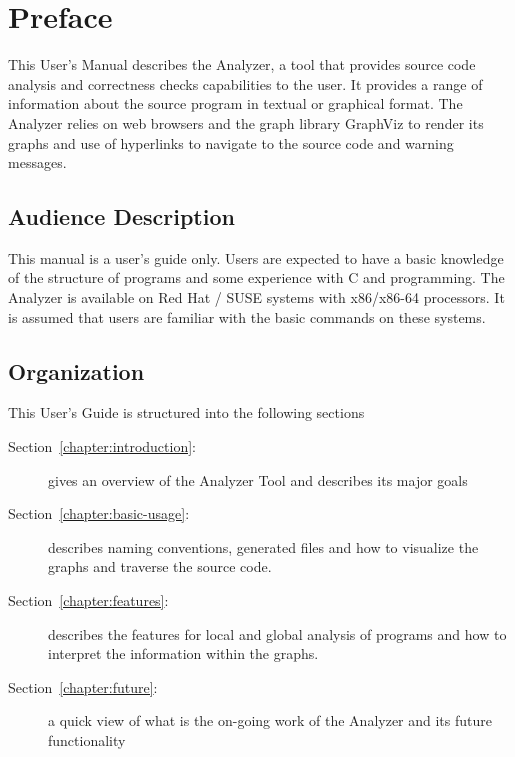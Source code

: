 





\tableofcontents
\listoffigures
\pagebreak

\section*{Preface}

This User's Manual describes the \openshmem Analyzer, a tool that
provides source code analysis and correctness checks capabilities to
the user. It provides a range of information about the source program
in textual or graphical format. The \openshmem Analyzer relies on web
browsers and the graph library GraphViz to render its graphs and use
of hyperlinks to navigate to the source code and warning messages.

\subsection*{Audience Description}

This manual is a user's guide only. Users are expected to have a basic
knowledge of the structure of programs and some experience with C and
\openshmem programming. The \openshmem Analyzer is available on Red Hat
/ SUSE systems with x86/x86-64 processors. It is assumed that users
are familiar with the basic commands on these systems.

\subsection*{Organization}

This User's Guide is structured into the following sections

\begin{description}
\item[Section~\ref{chapter:introduction}:~]
  gives an overview of the \openshmem Analyzer Tool and describes its
  major goals
\item[Section~\ref{chapter:basic-usage}:~]
  describes naming conventions, generated files and how to visualize
  the graphs and traverse the source code.
\item[Section~\ref{chapter:features}:~]
  describes the features for local and global analysis of \openshmem
  programs and how to interpret the information within the graphs.
\item [Section~\ref{chapter:future}:~] a quick
  view of what is the on-going work of the \openshmem Analyzer and its
  future functionality
\end{description}


